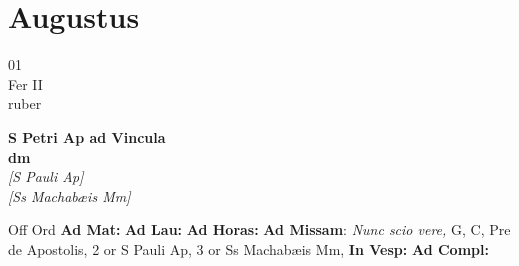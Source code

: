 \documentclass[10pt, openany]{book}
\begin{document}
        \chapter{Augustus}
                        
        \begin{center}
            \begin{minipage}{3.5in}
                \vspace{2em}
                \begin{minipage}{0.5in}
                    {\Huge 01} \\
                    {\normalsize Fer II} \\
                    {\normalsize ruber}
                \end{minipage}
                \begin{minipage}{3.0in}
                    \textbf{ \large S Petri Ap ad Vincula \\
                    \textnormal{\normalsize dm}} \\ \textit{[S Pauli Ap]} \\ \textit{[Ss Machabæis Mm]} \\ 
                \end{minipage}
                \begin{justify}Off Ord
                    \textbf{Ad Mat: }
                    \textbf{Ad Lau: }
                    \textbf{Ad Horas: }\textbf{Ad Missam}: \textit{Nunc scio vere,} G, C, Pre de Apostolis, 2 or S Pauli Ap, 3 or Ss Machabæis Mm,  
                    \textbf{In Vesp: }
                    \textbf{Ad Compl: }
                \end{justify}
            \end{minipage}
        \end{center}
    
\end{document}

